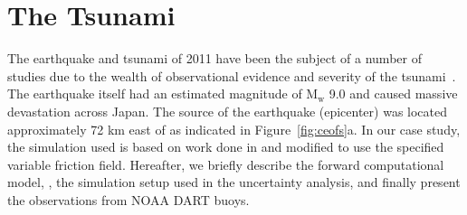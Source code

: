 
\section{The \tohoku Tsunami} 
\label{sec:tohoku}

The \tohoku earthquake and tsunami of 2011 have been the subject of a number of
studies due to the wealth of observational evidence and severity of the tsunami~\cite{Kawase2014}.
The earthquake itself had an estimated magnitude of $\text{M}_\text{w}$ 9.0 and
caused massive devastation across Japan. The source of the earthquake (epicenter)
was located approximately 72 km east of \tohoku as indicated 
in Figure~\ref{fig:ceofs}a. In our case study, the
simulation used is based on work done in \cite{MacInnes:2013cr} and modified to 
use the specified variable friction field. Hereafter, we briefly describe the
forward computational model, \geoclaw, the  simulation setup used in the
uncertainty analysis, and finally present the observations from NOAA DART buoys.


